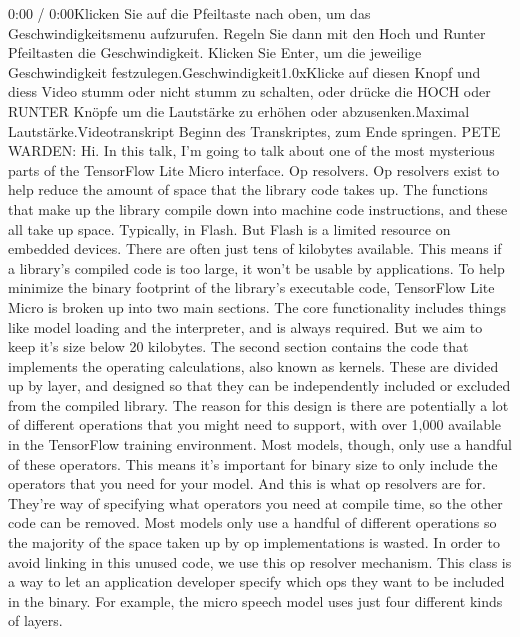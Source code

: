      0:00 / 0:00Klicken Sie auf die Pfeiltaste nach oben, um das Geschwindigkeitsmenu aufzurufen. Regeln Sie dann mit den Hoch und Runter Pfeiltasten die Geschwindigkeit. Klicken Sie Enter, um die jeweilige Geschwindigkeit festzulegen.Geschwindigkeit1.0xKlicke auf diesen Knopf und diess Video stumm oder nicht stumm zu schalten, oder drücke die HOCH oder RUNTER Knöpfe um die Lautstärke zu erhöhen oder abzusenken.Maximal Lautstärke.Videotranskript
     Beginn des Transkriptes, zum Ende springen.
     PETE WARDEN: Hi.
     In this talk, I'm going to talk about one
     of the most mysterious parts of the TensorFlow Lite Micro interface.
     Op resolvers.
     Op resolvers exist to help reduce the amount of space
     that the library code takes up.
     The functions that make up the library compile down
     into machine code instructions, and these all take up space.
     Typically, in Flash.
     But Flash is a limited resource on embedded devices.
     There are often just tens of kilobytes available.
     This means if a library's compiled code is too large,
     it won't be usable by applications.
     To help minimize the binary footprint of the library's executable code,
     TensorFlow Lite Micro is broken up into two main sections.
     The core functionality includes things like model loading and the interpreter,
     and is always required.
     But we aim to keep it's size below 20 kilobytes.
     The second section contains the code that implements the operating
     calculations, also known as kernels.
     These are divided up by layer, and designed
     so that they can be independently included or excluded
     from the compiled library.
     The reason for this design is there are potentially
     a lot of different operations that you might
     need to support, with over 1,000 available in the TensorFlow training
     environment.
     Most models, though, only use a handful of these operators.
     This means it's important for binary size
     to only include the operators that you need for your model.
     And this is what op resolvers are for.
     They're way of specifying what operators you need at compile time,
     so the other code can be removed.
     Most models only use a handful of different operations
     so the majority of the space taken up by op implementations is wasted.
     In order to avoid linking in this unused code,
     we use this op resolver mechanism.
     This class is a way to let an application developer specify which ops
     they want to be included in the binary.
     For example, the micro speech model uses just four different kinds of layers.
